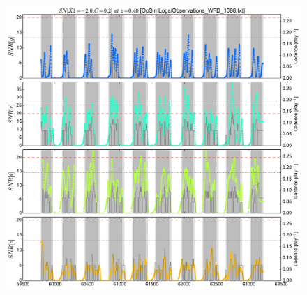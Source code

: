 \documentclass[\docopts]{\docclass}
\begin{document}
\begin{figure}[t]
  \begin{center}
    \includegraphics[width=\linewidth]{metric_WFD_1088.pdf}
    \caption{}
  \end{center}
\end{figure}
\end{document}
